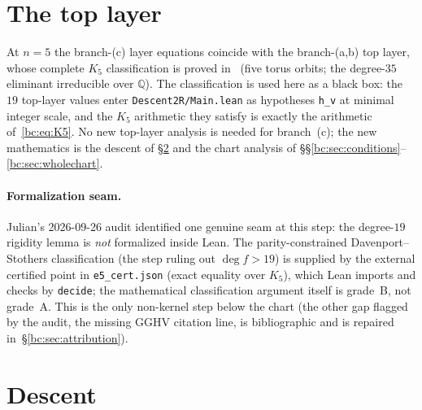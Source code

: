 \documentclass[a4paper,11pt]{article}
\theoremstyle{plain}
\theoremstyle{definition}
\theoremstyle{remark}
\begin{document}
\section{The top layer}\label{bc:sec:top}

At $n=5$ the branch-(c) layer equations coincide with the branch-(a,b) top layer, whose complete $K_5$ classification is proved in~\cite{BranchABv19} (five torus orbits; the degree-$35$ eliminant irreducible over $\mathbb{Q}$). The classification is used here as a black box: the $19$ top-layer values enter \texttt{Descent2R/Main.lean} as hypotheses \texttt{h\_v} at minimal integer scale, and the $K_5$ arithmetic they satisfy is exactly the arithmetic of~\eqref{bc:eq:K5}. No new top-layer analysis is needed for branch~(c); the new mathematics is the descent of \S\ref{bc:sec:descent} and the chart analysis of \S\S\ref{bc:sec:conditions}--\ref{bc:sec:wholechart}.

\paragraph{Formalization seam.} Julian's 2026-09-26 audit identified one genuine seam at this step: the degree-$19$ rigidity lemma is \emph{not} formalized inside Lean. The parity-constrained Davenport--Stothers classification (the step ruling out $\deg f > 19$) is supplied by the external certified point in \texttt{e5\_cert.json} (exact equality over $K_5$), which Lean imports and checks by \texttt{decide}; the mathematical classification argument itself is grade~B, not grade~A. This is the only non-kernel step below the chart (the other gap flagged by the audit, the missing GGHV citation line, is bibliographic and is repaired in~\S\ref{bc:sec:attribution}).

\section{Descent}\label{bc:sec:descent}
\end{document}
